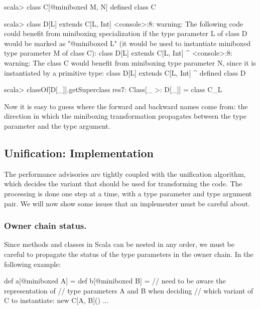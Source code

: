 \begin{lstlisting-nobreak-nolang}
scala> class C[@miniboxed M, N]
defined class C

scala> class D[L] extends C[L, Int]
<console>:8: warning: The following code could benefit from miniboxing specialization if the type parameter L of class D would be marked as "@miniboxed L" (it would be used to instantiate miniboxed type parameter M of class C):
       class D[L] extends C[L, Int]
               ^
<console>:8: warning: The class C would benefit from miniboxing type parameter N, since it is instantiated by a primitive type:
       class D[L] extends C[L, Int]
               ^
defined class D

scala> classOf[D[_]].getSuperclass
res7: Class[_ >: D[_]] = class C_L
\end{lstlisting-nobreak-nolang}

Now it is easy to guess where the forward and backward names come from: the direction in which the miniboxing transformation propagates between the type parameter and the type argument.



\subsection{Unification: Implementation}



The performance advisories are tightly coupled with the unification algorithm, which decides the variant that should be used for transforming the code. The processing is done one step at a time, with a type parameter and type argument pair. We will now show some issues that an implementer must be careful about.



\subsubsection*{Owner chain status.} Since methods and classes in Scala can be nested in any order, we must be careful to propagate the status of the type parameters in the owner chain. In the following example:

\begin{lstlisting-nobreak}
 def a[@miniboxed A] = {
   def b[@miniboxed B] = {
     // need to be aware the representation of
     // type parameters A and B when deciding
     // which variant of C to instantiate:
     new C[A, B]()
   }
   ...
 }
\end{lstlisting-nobreak}

